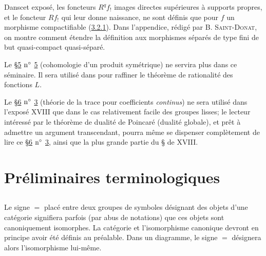 \documentclass[10pt]{../fichiers-configuration-latex/smfart}
\begin{document}
Dans\pageoriginale cet exposé, les foncteurs $R^{q}f_{!}$ images
directes supérieures à supports propres, et le foncteur $Rf_{!}$ qui
leur donne naissance, ne sont définis que pour $f$ un morphisme
compactifiable (\hyperref[XVII.def3.2.1]{3.2.1}). Dans l'appendice, rédigé par
\textsc{B. Saint-Donat}, on montre comment étendre la définition aux
morphismes séparés de type fini de but quasi-compact quasi-séparé.

Le \S \hyperref[XVII.sec5]{5} ${\rm n^{\circ}}$ \hyperref[XVII.sec5]{5} (cohomologie
d'un produit symétrique) ne servira plus dans ce séminaire. Il sera
utilisé dans  pour raffiner le théorème de rationalité des
fonctions $L$.

Le \S \hyperref[XVII.sec6]{6} ${\rm n^{\circ}}$ \hyperref[XVII.sec3]{3} (théorie de la
trace pour coefficients \emph{continus}) ne sera utilisé dans l'exposé
XVIII que dans le cas relativement facile des groupes lisses; le
lecteur intéressé par le théorème de dualité de Poincaré (dualité
globale), et prêt à admettre un argument transcendant, pourra même se
dispenser complètement de lire ce \S \hyperref[XVII.sec6]{6} ${\rm n^{\circ}}$
\hyperref[XVII.sec3]{3}, ainsi que la plus grande partie du \S {}
de XVIII.

\setcounter{section}{-1}
\section{Préliminaires terminologiques}

\subsection{}
Le signe $=$ placé entre deux groupes de symboles désignant des objets
d'une catégorie signifiera parfois (par abus de notations) que ces
objets sont canoniquement isomorphes. La catégorie et l'isomorphisme
canonique devront en principe avoir été définis au préalable. Dans un
diagramme, le signe $=$ désignera alors l'isomorphisme lui-même.
\end{document}
